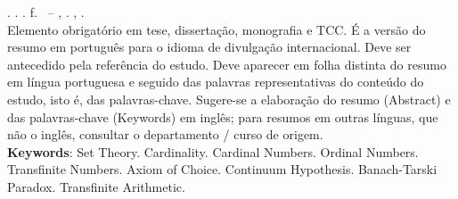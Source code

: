 
\begin{resumo}[ABSTRACT]
    \begin{SingleSpacing}

        \imprimirautorcitacao. \imprimirtitleabstract. \imprimirdata. \pageref {LastPage} f. \imprimirprojeto\ – \imprimirprograma, \imprimirinstituicao. \imprimirlocal, \imprimirdata.\\

        Elemento obrigatório em tese, dissertação, monografia e TCC. É a versão do resumo em português para o idioma de divulgação internacional. Deve ser antecedido pela referência do estudo. Deve aparecer em folha distinta do resumo em língua portuguesa e seguido das palavras representativas do conteúdo do estudo, isto é, das palavras-chave. Sugere-se a elaboração do resumo (Abstract) e das palavras-chave (Keywords) em inglês; para resumos em outras línguas, que não o inglês, consultar o departamento / curso de origem.\\

        \textbf{Keywords}: Set Theory. Cardinality. Cardinal Numbers. Ordinal Numbers. Transfinite Numbers. Axiom of Choice. Continuum Hypothesis. Banach-Tarski Paradox. Transfinite Arithmetic.

    \end{SingleSpacing}
\end{resumo}

